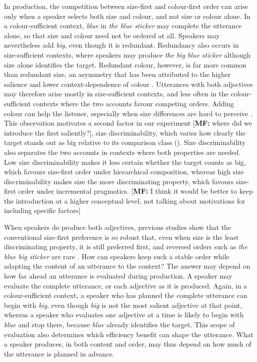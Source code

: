 \documentclass[10pt,a4paper,fleqn]{article}
\newcommand{\mf}[1]{\textcolor{shimmer-main}{[\textbf{MF: }{#1}]}}
\begin{document}
\label{sec:bg:efficiency}
In production, the competition between size-first and colour-first order can arise only when a speaker selects both size and colour, and not size or colour alone.
In a colour-sufficient context, \emph{blue} in \emph{the blue sticker} may complete the utterance alone, so that size and colour need not be ordered at all.
Speakers may nevertheless add \emph{big}, even though it is redundant.
Redundancy also occurs in size-sufficient contexts, where speakers may produce \emph{the big blue sticker} although size alone identifies the target.
Redundant colour, however, is far more common than redundant size, an asymmetry that has been attributed to the higher salience and lower context-dependence of colour \citep{tarenskeen2015overspecification,rubio2016redundant,degen2020redundancy,tourtouri2021rational}.
Utterances with both adjectives may therefore arise mostly in size-sufficient contexts, and less often in the colour-sufficient contexts where the two accounts favour competing orders.
Adding colour can help the listener, especially when size differences are hard to perceive \citep{rubio2016redundant,degen2020redundancy}.
This observation motivates a second factor in our experiment \mf{where did we introduce the first saliently?}, size discriminability, which varies how clearly the target stands out as big relative to its comparison class ().
Size discriminability also separates the two accounts in contexts where both properties are needed.
Low size discriminability makes it less certain whether the target counts as big, which favours size-first order under hierarchical composition, whereas high size discriminability makes size the more discriminating property, which favours size-first order under incremental pragmatics.
\mf{I think it would be better to keep the introduction at a higher conceptual level, not talking about motivations for including specific factors}

When speakers do produce both adjectives, previous studies show that the conventional size-first preference is so robust that, even when size is the least discriminating property, it is still preferred first, and reversed orders such as \emph{the blue big sticker} are rare \citep{danks1972prenominal,pechmann1989incremental,schlotterbeck2023incremental}.
How can speakers keep such a stable order while adapting the content of an utterance to the context?
The answer may depend on how far ahead an utterance is evaluated during production.
A speaker may evaluate the complete utterance, or each adjective as it is produced.
Again, in a colour-sufficient context, a speaker who has planned the complete utterance can begin with \emph{big}, even though \emph{big} is not the most salient adjective at that point, whereas a speaker who evaluates one adjective at a time is likely to begin with \emph{blue} and stop there, because \emph{blue} already identifies the target.
This scope of evaluation also determines which efficiency benefit can shape the utterance.
What a speaker produces, in both content and order, may thus depend on how much of the utterance is planned in advance.
\end{document}
